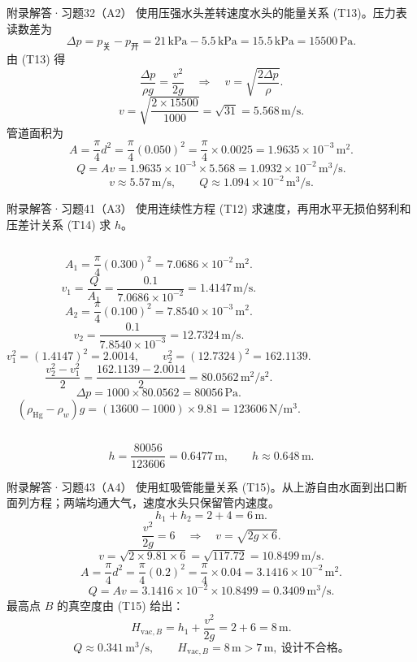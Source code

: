 \documentclass[aspectratio=169,10pt]{beamer}
\begin{document}
\begin{frame}{附录解答·习题32（A2）}
  \footnotesize
  使用压强水头差转速度水头的能量关系 (T13)。压力表读数差为
  \[
    \Delta p=p_{\text{关}}-p_{\text{开}}
    =21\,\mathrm{kPa}-5.5\,\mathrm{kPa}
    =15.5\,\mathrm{kPa}
    =15500\,\mathrm{Pa}.
  \]
  由 (T13) 得
  \[
    \frac{\Delta p}{\rho g}=\frac{v^2}{2g}
    \quad\Longrightarrow\quad
    v=\sqrt{\frac{2\Delta p}{\rho}}.
  \]
  \[
    v=\sqrt{\frac{2\times15500}{1000}}
    =\sqrt{31}
    =5.568\,\mathrm{m/s}.
  \]
  管道面积为
  \[
    A=\frac{\pi}{4}d^2
    =\frac{\pi}{4}(0.050)^2
    =\frac{\pi}{4}\times0.0025
    =1.9635\times10^{-3}\,\mathrm{m^2}.
  \]
  \[
    Q=Av=1.9635\times10^{-3}\times5.568
    =1.0932\times10^{-2}\,\mathrm{m^3/s}.
  \]
  \[
    \boxed{v\approx5.57\,\mathrm{m/s},\qquad Q\approx1.094\times10^{-2}\,\mathrm{m^3/s}.}
  \]
\end{frame}

\begin{frame}{附录解答·习题41（A3）}
  \footnotesize
  使用连续性方程 (T12) 求速度，再用水平无损伯努利和压差计关系 (T14) 求 $h$。
  \begin{columns}[T]
      \[
        A_1=\frac{\pi}{4}(0.300)^2
        =7.0686\times10^{-2}\,\mathrm{m^2}.
      \]
      \[
        v_1=\frac{Q}{A_1}
        =\frac{0.1}{7.0686\times10^{-2}}
        =1.4147\,\mathrm{m/s}.
      \]
      \[
        A_2=\frac{\pi}{4}(0.100)^2
        =7.8540\times10^{-3}\,\mathrm{m^2}.
      \]
      \[
        v_2=\frac{0.1}{7.8540\times10^{-3}}
        =12.7324\,\mathrm{m/s}.
      \]
      \[
        v_1^2=(1.4147)^2=2.0014,\qquad
        v_2^2=(12.7324)^2=162.1139.
      \]
      \[
        \frac{v_2^2-v_1^2}{2}
        =\frac{162.1139-2.0014}{2}
        =80.0562\,\mathrm{m^2/s^2}.
      \]
      \[
        \Delta p=1000\times80.0562=80056\,\mathrm{Pa}.
      \]
      \[
        (\rho_{\mathrm{Hg}}-\rho_w)g=(13600-1000)\times9.81=123606\,\mathrm{N/m^3}.
      \]
  \end{columns}
  \[
    h=\frac{80056}{123606}=0.6477\,\mathrm m,
    \qquad
    \boxed{h\approx0.648\,\mathrm m.}
  \]
\end{frame}

\begin{frame}{附录解答·习题43（A4）}
  \footnotesize
  使用虹吸管能量关系 (T15)。从上游自由水面到出口断面列方程；两端均通大气，速度水头只保留管内速度。
  \[
    h_1+h_2=2+4=6\,\mathrm m.
  \]
  \[
    \frac{v^2}{2g}=6
    \quad\Longrightarrow\quad
    v=\sqrt{2g\times6}.
  \]
  \[
    v=\sqrt{2\times9.81\times6}
    =\sqrt{117.72}
    =10.8499\,\mathrm{m/s}.
  \]
  \[
    A=\frac{\pi}{4}d^2
    =\frac{\pi}{4}(0.2)^2
    =\frac{\pi}{4}\times0.04
    =3.1416\times10^{-2}\,\mathrm{m^2}.
  \]
  \[
    Q=Av=3.1416\times10^{-2}\times10.8499
    =0.3409\,\mathrm{m^3/s}.
  \]
  最高点 $B$ 的真空度由 (T15) 给出：
  \[
    H_{\mathrm{vac},B}=h_1+\frac{v^2}{2g}=2+6=8\,\mathrm m.
  \]
  \[
    \boxed{Q\approx0.341\,\mathrm{m^3/s},\qquad H_{\mathrm{vac},B}=8\,\mathrm m>7\,\mathrm m,\ \text{设计不合格。}}
  \]
\end{frame}
\end{document}
